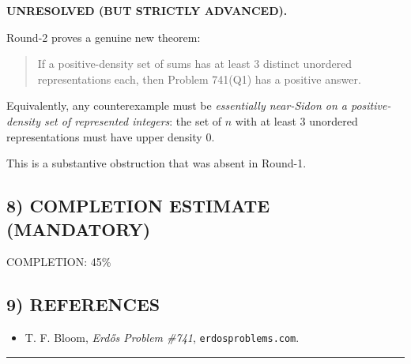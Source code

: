 \noindent
\textbf{UNRESOLVED (BUT STRICTLY ADVANCED).}

Round-2 proves a genuine new theorem:
\begin{quote}
If a positive-density set of sums has at least $3$ distinct unordered representations each, then Problem 741(Q1) has a positive answer.
\end{quote}
Equivalently, any counterexample must be \emph{essentially near-Sidon on a positive-density set of represented integers}: the set of $n$ with at least $3$ unordered representations must have upper density $0$.

This is a substantive obstruction that was absent in Round-1.

\subsection*{8) COMPLETION ESTIMATE (MANDATORY)}

COMPLETION: 45\%

\subsection*{9) REFERENCES}

\begin{itemize}
\item T. F. Bloom, \emph{Erd\H{o}s Problem \#741}, \texttt{erdosproblems.com}.
\end{itemize}

\bigskip
\hrule
\bigskip

